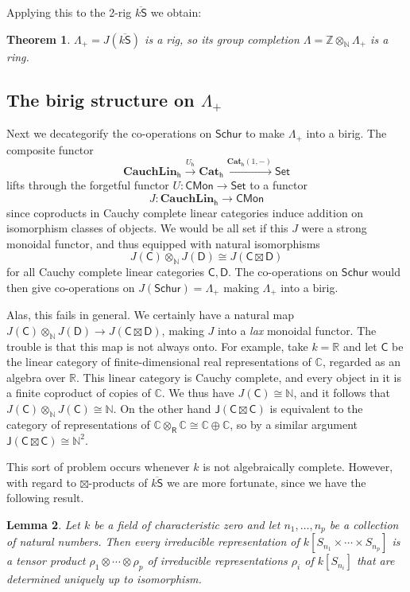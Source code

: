 \documentclass[12pt,reqno]{amsart}
\theoremstyle{plain}
\newtheorem{thm}{Theorem}
\newtheorem{lem}[thm]{Lemma}
\theoremstyle{definition}
\theoremstyle{remark}
\newcommand{\maps}{\colon}
\newcommand{\category}[1]{\mathsf{#1}}
\newcommand{\C}{\category C}
\newcommand{\D}{\category D}
\newcommand{\J}{\category J}
\newcommand{\N}{\mathbb N}
\newcommand{\R}{\category R}
\renewcommand{\S}{\category S}
\newcommand{\namedcat}[1]{\mathsf{#1}}
\newcommand{\CMon}{\namedcat{CMon}}
\newcommand{\Set}{\namedcat{Set}}
\newcommand{\Schur}{\namedcat{Schur}}
\newcommand{\namedbicat}[1]{\mathbf{#1}}
\newcommand{\CCat}{\namedbicat{Cat}}
\newcommand{\Lin}{\namedbicat{Lin}}
\newcommand{\Cauch}{\namedbicat{Cauch}}
\newcommand{\ho}{_\mathsf{h}}
\newcommand{\ksbar}{\overline{k\S}}
\numberwithin{thm}{section}
\begin{document}
Applying this to the 2-rig $\ksbar$ we obtain:

\begin{thm}
$\Lambda_+ = J(\ksbar)$ is a rig, so its group completion $\Lambda = \mathbb{Z} \otimes_\N \Lambda_+$ is a ring.
\end{thm}

\subsection{The birig structure on $\Lambda_+$}

Next we decategorify the co-operations on $\Schur$ to make $\Lambda_+$ into a birig. The composite functor 
\[
\Cauch\Lin\ho \xrightarrow{U\ho} \CCat\ho \xrightarrow{\CCat\ho(1, -)} \Set
\]
lifts through the forgetful functor $U \maps \CMon \to \Set$ to a functor 
\[
    J \maps \Cauch\Lin\ho \to \CMon
\]
since coproducts in Cauchy complete linear categories induce addition on  isomorphism classes of objects. We would be all set if this $J$ were a strong monoidal functor, and thus equipped with natural isomorphisms
\[
    J(\C) \otimes_\N J(\D) \cong J(\C \boxtimes \D)
\]
for all Cauchy complete linear categories $\C, \D$. The co-operations on $\Schur$ would then give co-operations on $J(\Schur) = \Lambda_+$ making $\Lambda_+$ into a birig.

Alas, this fails in general. We certainly have a natural map $J(\C) \otimes_\N J(\D) \to J(\C \boxtimes \D)$, making $J$ into a \emph{lax} monoidal functor. The trouble is that this map is not always onto. For example, take $k = \mathbb{R}$ and let $\C$ be the linear category of finite-dimensional real representations of $\mathbb{C}$, regarded as an algebra over $\mathbb{R}$. This linear category is Cauchy complete, and every object in it is a finite coproduct of copies of $\mathbb{C}$. We thus have $J(\C) \cong \N$, and it follows that $J(\C) \otimes_\N J(\C) \cong \N$. On the other hand $\J(\C \boxtimes \C)$ is equivalent to the category of representations of $\mathbb{C} \otimes_\R \mathbb{C} \cong \mathbb{C} \oplus \mathbb{C}$, so by a similar argument $\J(\C \boxtimes \C) \cong \N^2$. 

This sort of problem occurs whenever $k$ is not algebraically complete. However, with regard to $\boxtimes$-products of $\overline{k \S}$ we are more fortunate, since we have the following result. 

\begin{lem}
\label{lem:irreps-of-products}
    Let $k$ be a field of characteristic zero and let $n_1, \ldots, n_p$ be a collection of natural numbers. Then every irreducible representation of $k[S_{n_1} \times \cdots \times S_{n_p}]$ is a tensor product $\rho_1 \otimes \cdots \otimes \rho_p$ of irreducible representations $\rho_i$ of $k[S_{n_i}]$ that are determined uniquely up to isomorphism.
\end{lem}
\end{document}
